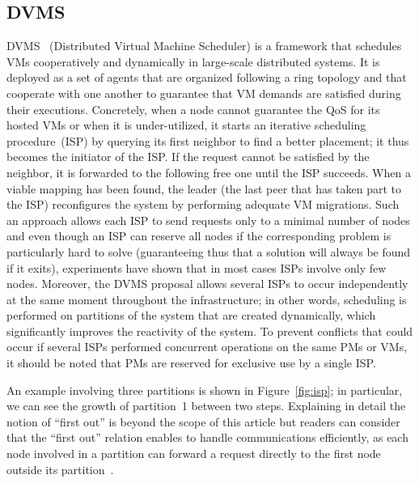 \subsection{DVMS}\label{ssec:dvms}

DVMS~\cite{quesnel:ispa2013,quesnel:cpe2012} (Distributed Virtual Machine Scheduler) is a
framework that schedules VMs cooperatively and dynamically in large-scale distributed
systems. It is deployed as a set of agents that are organized following a ring topology
and that cooperate with one another to guarantee that VM demands are satisfied during
their executions. Concretely, when a node cannot guarantee the QoS for its hosted VMs or
when it is under-utilized, it starts an iterative scheduling procedure~(ISP) by querying
its first neighbor to find a better placement; it thus becomes the initiator of the ISP.
If the request cannot be satisfied by the neighbor, it is forwarded to the following free
one until the ISP succeeds. When a viable mapping has been found, the leader (\ie the last
peer that has taken part to the ISP) reconfigures the system by performing adequate VM
migrations. Such an approach allows each ISP to send requests only to a minimal number of
nodes and even though an ISP can reserve all nodes if the corresponding problem is
particularly hard to solve (guaranteeing thus that a solution will always be found if it
exits), experiments have shown that in most cases ISPs involve only few
nodes. Moreover, the DVMS proposal allows several ISPs to occur independently at the same
moment throughout the infrastructure; in other words, scheduling is performed on
partitions of the system that are created dynamically, which significantly improves the
reactivity of the system. To prevent conflicts that could occur if several ISPs performed
concurrent operations on the same PMs or VMs, it should be noted that PMs are reserved for
exclusive use by a single ISP.

An example involving three partitions is shown in Figure~\ref{fig:isp}; in particular, we
can see the growth of partition~1 between two steps. Explaining in detail the notion of
``first out'' is beyond the scope of this article but readers can consider that the
``first out'' relation enables to handle communications efficiently, as each node involved
in a partition can forward a request directly to the first node outside its
partition~\cite{quesnel:cpe2012}.

